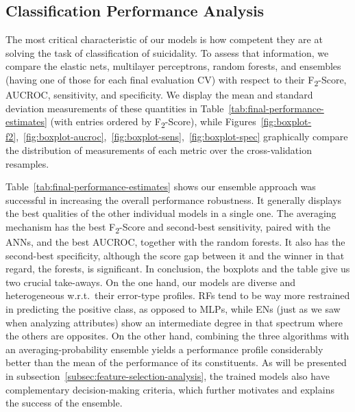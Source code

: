 \subsection{Classification Performance Analysis}\label{subsec:final-performance-analysis}

The most critical characteristic of our models is how competent they are at solving the task of classification of suicidality.
To assess that information, we compare the elastic nets, multilayer perceptrons, random forests, and ensembles (having one of those for each final evaluation CV) with respect to their F\textsubscript{2}-Score, AUCROC, sensitivity, and specificity.
We display the mean and standard deviation measurements of these quantities in Table~\ref{tab:final-performance-estimates} (with entries ordered by F\textsubscript{2}-Score), while Figures~\ref{fig:boxplot-f2},~\ref{fig:boxplot-aucroc},~\ref{fig:boxplot-sens},~\ref{fig:boxplot-spec} graphically compare the distribution of measurements of each metric over the cross-validation resamples.

Table~\ref{tab:final-performance-estimates} shows our ensemble approach was successful in increasing the overall performance robustness.
It generally displays the best qualities of the other individual models in a single one.
The averaging mechanism has the best F\textsubscript{2}-Score and second-best sensitivity, paired with the ANNs, and the best AUCROC, together with the random forests.
It also has the second-best specificity, although the score gap between it and the winner in that regard, the forests, is significant.
In conclusion, the boxplots and the table give us two crucial take-aways.
On the one hand, our models are diverse and heterogeneous w.r.t.\ their error-type profiles.
RFs tend to be way more restrained in predicting the positive class, as opposed to MLPs, while ENs (just as we saw when analyzing attributes) show an intermediate degree in that spectrum where the others are opposites.
On the other hand, combining the three algorithms with an averaging-probability ensemble yields a performance profile considerably better than the mean of the performance of its constituents.
As will be presented in subsection~\ref{subsec:feature-selection-analysis}, the trained models also have complementary decision-making criteria, which further motivates and explains the success of the ensemble.

